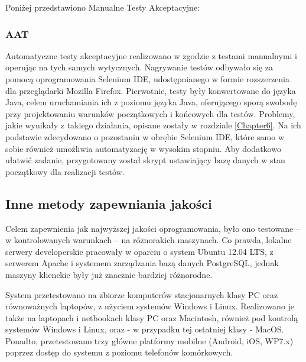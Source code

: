 Poniżej przedstawiono Manualne Testy Akceptacyjne:

\matpres
{}
\matsteps
{}

\matpres
{}
\matsteps
{}

\subsubsection{AAT}
\label{Chapter7131}

Automatyczne testy akceptacyjne realizowano w zgodzie z testami manualnymi i operując na tych samych wytycznych. Nagrywanie testów odbywało się za pomocą oprogramowania Selenium IDE, udostępnianego w formie rozszerzenia dla przeglądarki Mozilla Firefox. Pierwotnie, testy były konwertowane do języka Java, celem uruchamiania ich z poziomu języka Java, oferującego sporą swobodę przy projektowaniu warunków początkowych i końcowych dla testów. Problemy, jakie wynikały z takiego działania, opisane zostały w rozdziale \ref{Chapter6}. Na ich podstawie zdecydowano o pozostaniu w obrębie Selenium IDE, które samo w sobie również umożliwia automatyzację w wysokim stopniu. Aby dodatkowo ułatwić zadanie, przygotowany został skrypt ustawiający bazę danych w stan początkowy dla realizacji testów.

\subsection{Inne metody zapewniania jakości}
\label{Chapter714}

Celem zapewnienia jak najwyższej jakości oprogramowania, było ono testowane -- w kontrolowanych warunkach -- na różnorakich maszynach. Co prawda, lokalne serwery developerskie pracowały w oparciu o system Ubuntu 12.04 LTS, z serwerem Apache i systemem zarządzania bazą danych PostgreSQL, jednak maszyny klienckie były już znacznie bardziej różnorodne.

System przetestowano na zbiorze komputerów stacjonarnych klasy PC oraz równoważnych laptopów, z użyciem systemów Windows i Linux. Realizowano je także na laptopach i netbookach klasy PC oraz Macintosh, również pod kontrolą systemów Windows i Linux, oraz - w przypadku tej ostatniej klasy - MacOS. Ponadto, przetestowano trzy główne platformy mobilne (Android, iOS, WP7.x) poprzez dostęp do systemu z poziomu telefonów komórkowych.

